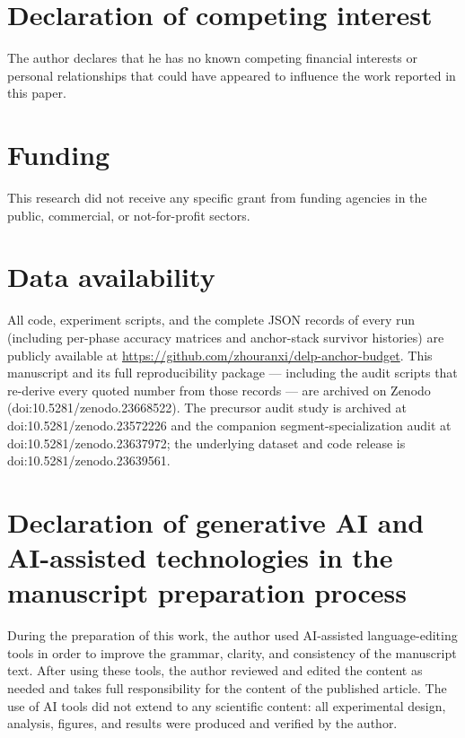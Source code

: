 \documentclass[review,12pt,number]{elsarticle}
\begin{document}
\section*{Declaration of competing interest}
The author declares that he has no known competing financial interests
or personal relationships that could have appeared to influence the
work reported in this paper.

\section*{Funding}
This research did not receive any specific grant from funding agencies
in the public, commercial, or not-for-profit sectors.

\begin{sloppypar}
\section*{Data availability}
All code, experiment scripts, and the complete JSON records of every
run (including per-phase accuracy matrices and anchor-stack survivor
histories) are publicly available at
\url{https://github.com/zhouranxi/delp-anchor-budget}. This manuscript
and its full reproducibility package --- including the audit scripts
that re-derive every quoted number from those records --- are archived
on Zenodo (doi:10.5281/zenodo.23668522). The precursor audit study is
archived at doi:10.5281/zenodo.23572226 and the companion
segment-specialization audit at doi:10.5281/zenodo.23637972; the
underlying dataset and code release is
doi:10.5281/zenodo.23639561.
\end{sloppypar}

\section*{Declaration of generative AI and AI-assisted
technologies in the manuscript preparation process}
During the preparation of this work, the author used AI-assisted
language-editing tools in order to improve the grammar, clarity, and
consistency of the manuscript text. After using these tools, the
author reviewed and edited the content as needed and takes full
responsibility for the content of the published article. The use of
AI tools did not extend to any scientific content: all experimental
design, analysis, figures, and results were produced and verified by
the author.



\end{document}
